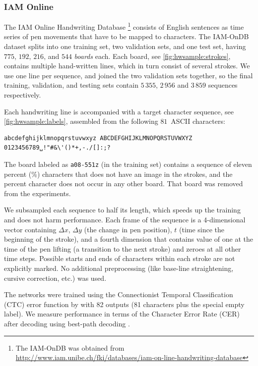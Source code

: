 \subsubsection*{IAM Online}

The IAM Online Handwriting Database \cite{Liwicki2005}\footnote{The IAM-OnDB was obtained from
  \url{http://www.iam.unibe.ch/fki/databases/iam-on-line-handwriting-database}} consists of English sentences as time series of pen movements that have to be mapped to characters. The IAM-OnDB dataset splits into one training set, two validation sets, and one test set, having $775$, $192$, $216$, and $544$ {\it boards} each. Each board, see \autoref{fig:hwsample:strokes}, contains multiple hand-written lines, which in turn consist of several strokes. We use one line per sequence, and joined the two validation sets together, so the final training, validation, and testing sets contain $5\,355$, $2\,956$ and $3\,859$ sequences respectively.

Each handwriting line is accompanied with a target character sequence, see \autoref{fig:hwsample:labels}, assembled from the following $81$~ASCII characters:

\begin{verbatim}
abcdefghijklmnopqrstuvwxyz ABCDEFGHIJKLMNOPQRSTUVWXYZ
0123456789␣!"#&\'()*+,-./[]:;?
\end{verbatim}

The board labeled as {\tt a08-551z} (in the training set) contains a sequence of eleven percent (\%) characters that does not have an image in the strokes, and the percent character does not occur in any other board. That board was removed from the experiments.

We subsampled each sequence to half its length, which speeds up the training and does not harm performance. Each frame of the sequence is a 4-dimensional vector containing $\Delta x$, $\Delta y$ (the change in pen position),  $t$ (time since the beginning of the stroke), and a fourth dimension that contains value of one at the time of the pen lifting (a transition to the next stroke) and zeroes at all other time steps. Possible starts and ends of characters within each stroke are not explicitly marked. No additional preprocessing (like base-line straightening, cursive correction, etc.) was used.

The networks were trained using the Connectionist Temporal Classification (CTC) error function by \citet{Graves2006} with 82 outputs (81 characters plus the special empty label). We measure performance in terms of the Character Error Rate (CER) after decoding using best-path decoding \citep{Graves2006}.


